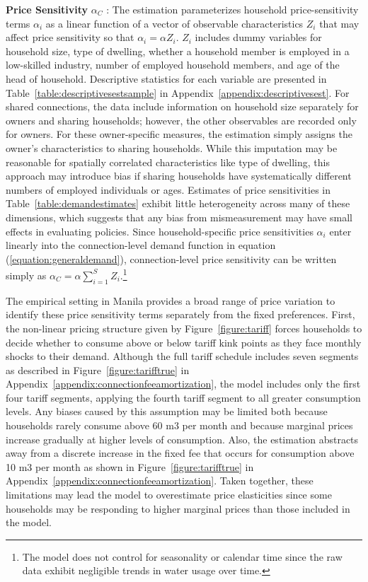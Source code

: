 \documentclass[12pt]{article}
\begin{document}
\textbf{Price Sensitivity} $\alpha_C$  :  The estimation parameterizes household price-sensitivity terms $\alpha_i$ as a linear function of a vector of observable characteristics $Z_i$ that may affect price sensitivity so that $\alpha_i = \alpha Z_i$.  $Z_i$ includes dummy variables for household size, type of dwelling, whether a household member is employed in a low-skilled industry, number of employed household members, and age of the head of household.  Descriptive statistics for each variable are presented in Table~\ref{table:descriptivesestsample} in Appendix~\ref{appendix:descriptivesest}.  For shared connections, the data include information on household size separately for owners and sharing households; however, the other observables are recorded only for owners.  For these owner-specific measures, the estimation simply assigns the owner's characteristics to sharing households.  While this imputation may be reasonable for spatially correlated characteristics like type of dwelling, this approach may introduce bias if sharing households have systematically different numbers of employed individuals or ages.  Estimates of price sensitivities in Table~\ref{table:demandestimates} exhibit little heterogeneity across many of these dimensions, which suggests that any bias from mismeasurement may have small effects in evaluating policies.  Since household-specific price sensitivities $\alpha_i$ enter linearly into the connection-level demand function in equation (\ref{equation:generaldemand}), connection-level price sensitivity can be written simply as $\alpha_C = \alpha \sum_{i=1}^{S} Z_i$.\footnote{The model does not control for seasonality or calendar time since the raw data exhibit negligible trends in water usage over time.}

The empirical setting in Manila provides a broad range of price variation to identify these price sensitivity terms separately from the fixed preferences.  First, the non-linear pricing structure given by Figure~\ref{figure:tariff} forces households to decide whether to consume above or below tariff kink points as they face monthly shocks to their demand.  Although the full tariff schedule includes seven segments as described in Figure~\ref{figure:tarifftrue} in Appendix~\ref{appendix:connectionfeeamortization}, the model includes only the first four tariff segments, applying the fourth tariff segment to all greater consumption levels.  Any biases caused by this assumption may be limited both because households rarely consume above 60 m3 per month and because marginal prices increase gradually at higher levels of consumption.  Also, the estimation abstracts away from a discrete increase in the fixed fee that occurs for consumption above 10 m3 per month as shown in Figure~\ref{figure:tarifftrue} in Appendix~\ref{appendix:connectionfeeamortization}.  Taken together, these limitations may lead the model to overestimate price elasticities since some households may be responding to higher marginal prices than those included in the model.
\end{document}
